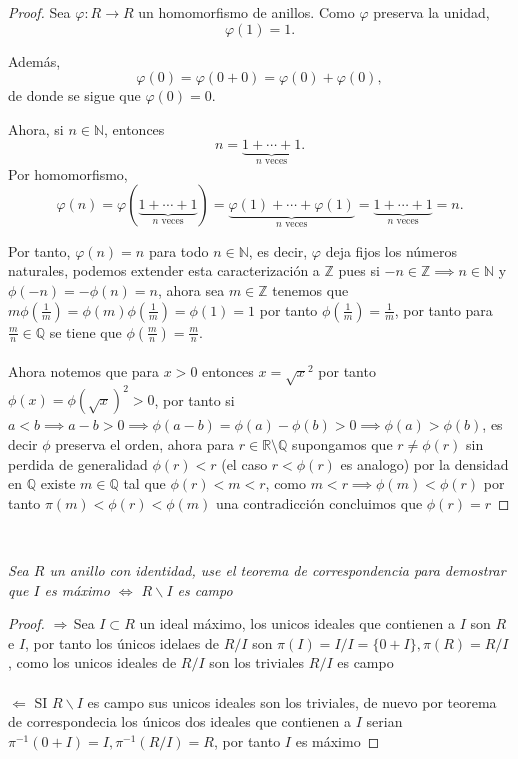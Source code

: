 \documentclass[11pt,letterpaper]{article}
\newcommand{\R}{\mathbb{R}}
\newcommand{\N}{\mathbb{N}}
\newcommand{\Z}{\mathbb{Z}}
\newcommand{\Q}{\mathbb{Q}}
\begin{document}
\begin{proof}
   Sea $\varphi:R\to R$ un homomorfismo de anillos. Como $\varphi$ preserva la unidad,
\[
\varphi(1)=1.
\]
 
Además,
\[
\varphi(0)=\varphi(0+0)=\varphi(0)+\varphi(0),
\]
de donde se sigue que $\varphi(0)=0$.
 
Ahora, si $n\in\mathbb N$, entonces
\[
n=\underbrace{1+\cdots+1}_{n\text{ veces}}.
\]
Por homomorfismo,
\[
\varphi(n)
=\varphi(\underbrace{1+\cdots+1}_{n\text{ veces}})
=\underbrace{\varphi(1)+\cdots+\varphi(1)}_{n\text{ veces}}
=\underbrace{1+\cdots+1}_{n\text{ veces}}
=n.
\]
 
Por tanto, $\varphi(n)=n$ para todo $n\in\mathbb N$, es decir, $\varphi$ deja fijos los números naturales, podemos extender esta caracterizaci\'on a $\Z$ pues si $-n\in \Z\implies n\in \N$ y $\phi(-n)=-\phi(n)=n$, ahora sea $m\in \Z$ tenemos
que $m\phi\left(\frac{1}{m}\right)=\phi(m)\phi\left(\frac{1}{m}\right)=\phi(1)=1$ por tanto $\phi\left(\frac{1}{m}\right)=\frac{1}{m}$, por tanto para $\frac{m}{n}\in \Q$ se tiene que $\phi\left(\frac{m}{n}\right)=\frac{m}{n}$.\,\\
\,\\
Ahora notemos que para $x>0$ entonces $x=\sqrt{x}^2$ por tanto $\phi(x)=\phi(\sqrt{x})^2>0$, por tanto si $a<b\implies a-b>0\implies \phi(a-b)=\phi(a)-\phi(b)>0\implies \phi(a)>\phi(b)$, es decir $\phi$ preserva el orden,
ahora para $r\in \R\setminus \Q$ supongamos que $r\neq \phi(r)$ sin perdida de generalidad $\phi(r)<r$ (el caso $r<\phi(r)$ es analogo) por la densidad en $\Q$ existe $m\in\Q$ tal que $\phi(r)<m<r$, como $m<r\implies\phi(m)<\phi(r)$ por tanto $\pi(m)<\phi(r)<\phi(m)$ una contradicci\'on
concluimos que $\phi(r)=r$
\end{proof}\,\\

\begin{tcolorbox}[
	title = \textcolor{black}{\textcolor{white}{Problema 3}},]
\textit{Sea $R$ un anillo con identidad, use el teorema de correspondencia para demostrar que $I$ es m\'aximo $\iff$ $R\backslash I$ es campo
}
\end{tcolorbox}
\begin{proof}
    $\Rightarrow$\,Sea $I\subset R$ un ideal m\'aximo, los unicos ideales que contienen a $I$ son $R$ e $I$, por tanto los \'unicos idelaes de $R/ I$ son $\pi(I)=I/ I=\{0+I\}, \pi(R)=R/ I$, como los unicos ideales
    de $R/ I$ son los triviales $R/ I$ es campo\,\\
    \,\\
    $\Leftarrow$\,\,SI $R\backslash I$ es campo sus unicos ideales son los triviales, de nuevo por teorema de correspondecia los \'unicos dos ideales que contienen a $I$ serian $\pi^{-1}(0+I)=I,\pi^{-1}(R/ I)=R$, por tanto $I$ es m\'aximo
\end{proof}\,\\
\end{document}
